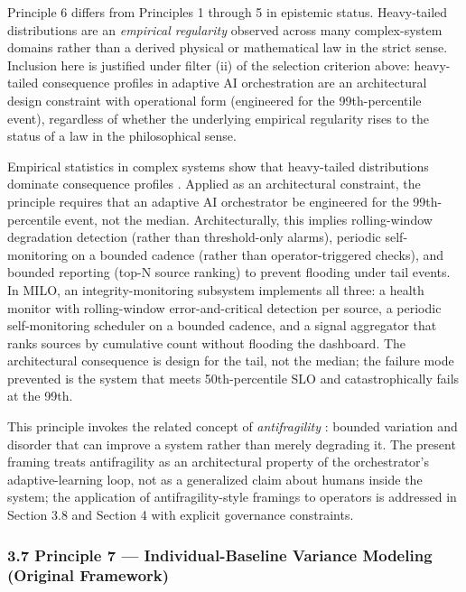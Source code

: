Principle 6 differs from Principles 1 through 5 in epistemic status.
Heavy-tailed distributions are an \emph{empirical regularity} observed
across many complex-system domains rather than a derived physical or
mathematical law in the strict sense. Inclusion here is justified under
filter (ii) of the selection criterion above: heavy-tailed consequence
profiles in adaptive AI orchestration are an architectural design
constraint with operational form (engineered for the 99th-percentile
event), regardless of whether the underlying empirical regularity rises
to the status of a law in the philosophical sense.

Empirical statistics in complex systems show that heavy-tailed
distributions dominate consequence profiles \cite{ref9}. Applied as an
architectural constraint, the principle requires that an adaptive AI
orchestrator be engineered for the 99th-percentile event, not the
median. Architecturally, this implies rolling-window degradation
detection (rather than threshold-only alarms), periodic self-monitoring
on a bounded cadence (rather than operator-triggered checks), and
bounded reporting (top-N source ranking) to prevent flooding under tail
events. In MILO, an integrity-monitoring subsystem implements all three:
a health monitor with rolling-window error-and-critical detection per
source, a periodic self-monitoring scheduler on a bounded cadence, and a
signal aggregator that ranks sources by cumulative count without
flooding the dashboard. The architectural consequence is design for the
tail, not the median; the failure mode prevented is the system that
meets 50th-percentile SLO and catastrophically fails at the 99th.

This principle invokes the related concept of \emph{antifragility}
\cite{ref10}: bounded variation and disorder that can improve a system
rather than merely degrading it. The present framing treats
antifragility as an architectural property of the orchestrator's
adaptive-learning loop, not as a generalized claim about humans inside
the system; the application of antifragility-style framings to operators
is addressed in Section 3.8 and Section 4 with explicit governance
constraints.

\subsubsection{3.7 Principle 7 --- Individual-Baseline Variance Modeling
(Original
Framework)}\label{principle-7-individual-baseline-variance-modeling-original-framework}

